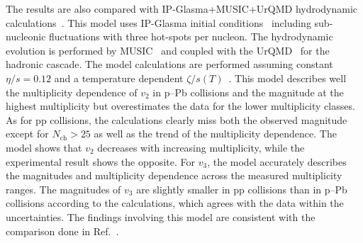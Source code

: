 The results are also compared with IP-Glasma+MUSIC+UrQMD hydrodynamic calculations~\cite{Schenke:2020mbo}. This model uses IP-Glasma initial conditions~\cite{Schenke:2012wb} including sub-nucleonic fluctuations with three hot-spots per nucleon. The hydrodynamic evolution is performed by MUSIC~\cite{Schenke:2010rr} and coupled with the UrQMD~\cite{Bass:1998ca,Bleicher:1999xi} for the hadronic cascade. 
The model calculations are performed assuming constant $\eta/s=0.12$ and a temperature dependent $\zeta/s(T)$~\cite{Rose:2020lfc}. 
This model describes well the multiplicity dependence of $v_2$ in p--Pb collisions and the magnitude at the highest multiplicity but overestimates the data for the lower multiplicity classes. As for pp collisions, the calculations clearly miss both the observed magnitude except for $N_\mathrm{ch}>25$ as well as the trend of the multiplicity dependence. The model shows that $v_2$ decreases with increasing multiplicity, while the experimental result shows the opposite.
For $v_3$, the model accurately describes the magnitudes and multiplicity dependence across the measured multiplicity ranges. The magnitudes of $v_3$ are slightly smaller in pp collisions than in p--Pb collisions according to the calculations, which agrees with the data within the uncertainties. The findings involving this model are consistent with the comparison done in Ref.~\cite{Acharya:2019vdf}.


